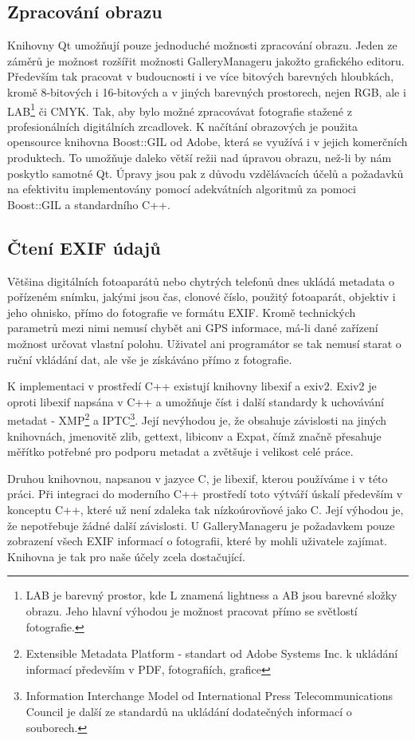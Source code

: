 \documentclass[11pt,twoside,a4paper]{book}
\begin{document}
\subsection{Zpracování obrazu}
\indent
Knihovny Qt umožňují pouze jednoduché možnosti zpracování obrazu. Jeden ze záměrů je možnost rozšířit možnosti GalleryManageru jakožto grafického editoru. Především tak pracovat v budoucnosti i ve více bitových barevných hloubkách, kromě 8-bitových i 16-bitových a v jiných barevných prostorech, nejen RGB, ale i LAB\footnote{LAB je barevný prostor, kde L znamená lightness a AB jsou barevné složky obrazu. Jeho hlavní výhodou je možnost pracovat přímo se světlostí fotografie.} či CMYK. Tak, aby bylo možné zpracovávat fotografie stažené z profesionálních digitálních zrcadlovek. K načítání obrazových je použita opensource knihovna Boost::GIL od Adobe, která se využívá i v jejich komerčních produktech. To umožňuje daleko větší režii nad úpravou obrazu, než-li by nám poskytlo samotné Qt. Úpravy jsou pak z důvodu vzdělávacích účelů a požadavků na efektivitu implementovány pomocí adekvátních algoritmů za pomoci Boost::GIL a standardního C++.

\subsection{Čtení EXIF údajů}
\noindent
Většina digitálních fotoaparátů nebo chytrých telefonů dnes ukládá metadata o pořízeném snímku, jakými jsou čas, clonové číslo, použitý fotoaparát, objektiv i jeho ohnisko, přímo do fotografie ve formátu EXIF. Kromě technických parametrů mezi nimi nemusí chybět ani GPS informace, má-li dané zařízení možnost určovat vlastní polohu. Uživatel ani programátor se tak nemusí starat o ruční vkládání dat, ale vše je získáváno přímo z fotografie.

\indent
K implementaci v prostředí C++ existují knihovny libexif a exiv2. Exiv2 je oproti libexif napsána v C++ a umožňuje číst i další standardy k uchovávání metadat - XMP\footnote{Extensible Metadata Platform - standart od Adobe Systems Inc. k ukládání informací především v PDF, fotografiích, grafice} a IPTC\footnote{Information Interchange Model od International Press Telecommunications Council je další ze standardů na ukládání dodatečných informací o souborech.}. Její nevýhodou je, že obsahuje závislosti na jiných knihovnách, jmenovitě zlib, gettext, libiconv a Expat, čímž značně přesahuje měřítko potřebné pro podporu metadat a zvětšuje i velikost celé práce.

\indent
Druhou knihovnou, napsanou v jazyce C, je libexif, kterou používáme i v této práci. Při integraci do moderního C++ prostředí toto výtváří úskalí především v konceptu C++, které už není zdaleka tak nízkoúrovňové jako C. Její výhodou je, že nepotřebuje žádné další závislosti. U GalleryManageru je požadavkem pouze zobrazení všech EXIF informací o fotografii, které by mohli uživatele zajímat. Knihovna je tak pro naše účely zcela dostačující.
\end{document}
